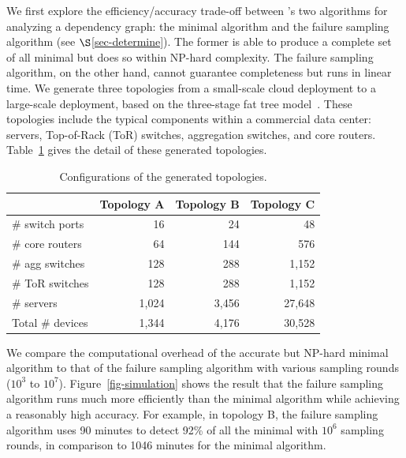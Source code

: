 We first explore the efficiency/accuracy
trade-off between \sia's
two algorithms for analyzing a dependency graph:
the minimal \rg algorithm and
the failure sampling algorithm (see $\S$\ref{sec-determine}).
The former is able to produce a complete
set of all minimal \rgs but does so within NP-hard complexity.
The failure sampling algorithm, on the other hand,
cannot guarantee completeness
but runs in linear time.
We generate three topologies
from a small-scale cloud deployment
to a large-scale deployment,
based on the three-stage
fat tree model~\cite{mysore09portland}.
These topologies include the typical components within
a commercial data center: servers, Top-of-Rack (ToR) switches,
aggregation switches, and core routers.
Table~\ref{tab-conf} gives the detail of these generated topologies.


\begin{table}[tbp]
	\centering
	\caption{Configurations of the generated topologies.}
	\begin{tabular}{l|r|r|r}
    \hline
    ~ &
    Topology A &
    Topology B &
    Topology C \\
    \hline
    \# switch ports & 16 & 24 & 48 \\
    \# core routers & 64 & 144 & 576 \\
    \# agg switches & 128 & 288 & 1,152 \\
    \# ToR switches & 128 & 288 & 1,152 \\
    \# servers & 1,024 & 3,456 & 27,648 \\
    \hline
    {Total \# devices} & 1,344 & 4,176 & 30,528 \\
    \hline
  \end{tabular}
  \label{tab-conf}
\end{table}


We compare the computational overhead
of the accurate but NP-hard minimal \rg algorithm
to that of the failure sampling algorithm with various sampling rounds ($10^3$ to $10^7$).
Figure~\ref{fig-simulation} shows the result that
the failure sampling algorithm
runs much more efficiently than the minimal \rg algorithm while achieving a reasonably high accuracy.
For example, in topology B, the failure sampling algorithm
uses 90 minutes to detect 92\% of all the minimal \rgs
with $10^6$ sampling rounds,
in comparison to 1046 minutes for the minimal \rg algorithm.


